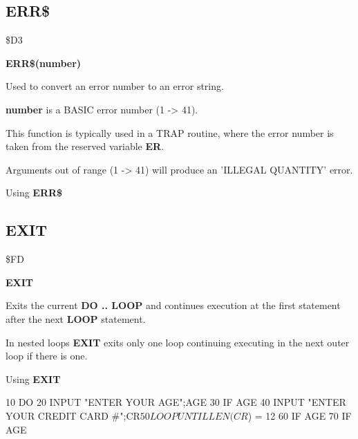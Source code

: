 
\newpage
\subsection{ERR\$}
\begin{description}[leftmargin=3cm,style=nextline]
\item [Token:] \$D3
\item [Format:] {\bf ERR\$(number)}
\item [Usage:] Used to convert
               an error number to an error string.

   {\bf number} is a BASIC error number (1 -> 41).

This function is typically used in a TRAP routine,
where the error number is taken from the reserved variable {\bf ER}.

\item [Remarks:] Arguments out of range (1 -> 41) will
                 produce an 'ILLEGAL QUANTITY' error.

\item [Example:] Using {\bf ERR\$}
\end{description}


\newpage
\subsection{EXIT}
\begin{description}[leftmargin=3cm,style=nextline]
\item [Token:] \$FD
\item [Format:] {\bf EXIT}
\item [Usage:] Exits the current {\bf DO .. LOOP}
               and continues execution at the first
               statement after the next {\bf LOOP} statement.

\item [Remarks:] In nested loops {\bf EXIT} exits only one loop
               continuing executing in the next outer loop
               if there is one.
\item [Example:] Using {\bf EXIT}
\begin{screenoutput}
10 DO
20 INPUT "ENTER YOUR AGE";AGE%
30 IF AGE%
40 INPUT "ENTER YOUR CREDIT CARD #";CR$
50 LOOP UNTIL LEN(CR$) = 12
60 IF AGE%
70 IF AGE%
\end{screenoutput}
\end{description}


